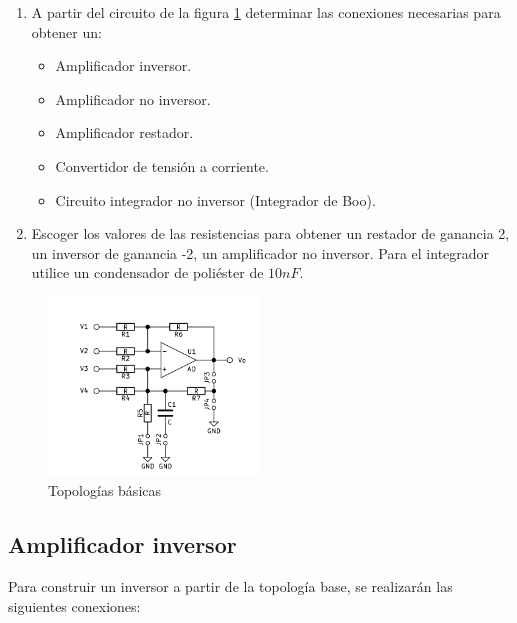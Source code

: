 \begin{enumerate}
    \item A partir del circuito de la figura \ref{fig:topologias-basicas} determinar las conexiones necesarias para obtener un:
        \begin{itemize}
            \item Amplificador inversor.
            \item Amplificador no inversor.
            \item Amplificador restador.
            \item Convertidor de tensión a corriente.
            \item Circuito integrador no inversor (Integrador de Boo).
        \end{itemize}

    \item Escoger los valores de las resistencias para obtener un restador de ganancia 2, un inversor de ganancia -2, un amplificador no inversor. Para el integrador utilice un condensador de poliéster de $10nF$.

\end{enumerate}

\begin{figure}[ht]
    \centering
    \includegraphics[width=0.5\textwidth]{src/images/topologias-basicas.png}
    \caption{Topologías básicas}
    \label{fig:topologias-basicas}
\end{figure}

\subsection{Amplificador inversor}

Para construir un inversor a partir de la topología base, se realizarán las siguientes conexiones:

\newcommand{\volt}[1]{$v_{#1}$}
\newcommand{\curr}[1]{$i_{#1}$}
\newcommand{\jumper}[1]{$JP_{#1}$}

